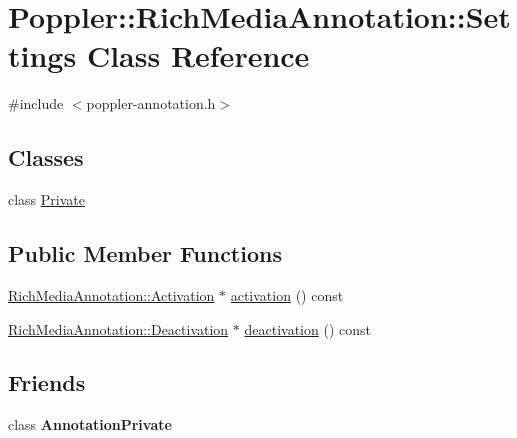 \hypertarget{class_poppler_1_1_rich_media_annotation_1_1_settings}{}\section{Poppler\+:\+:Rich\+Media\+Annotation\+:\+:Settings Class Reference}
\label{class_poppler_1_1_rich_media_annotation_1_1_settings}


{\ttfamily \#include $<$poppler-\/annotation.\+h$>$}

\subsection*{Classes}
\begin{DoxyCompactItemize}
\item 
class \hyperlink{class_poppler_1_1_rich_media_annotation_1_1_settings_1_1_private}{Private}
\end{DoxyCompactItemize}
\subsection*{Public Member Functions}
\begin{DoxyCompactItemize}
\item 
\hyperlink{class_poppler_1_1_rich_media_annotation_1_1_activation}{Rich\+Media\+Annotation\+::\+Activation} $\ast$ \hyperlink{class_poppler_1_1_rich_media_annotation_1_1_settings_a728542a659141af0cf7a721561b20bf4}{activation} () const
\item 
\hyperlink{class_poppler_1_1_rich_media_annotation_1_1_deactivation}{Rich\+Media\+Annotation\+::\+Deactivation} $\ast$ \hyperlink{class_poppler_1_1_rich_media_annotation_1_1_settings_ad82cea32021c702293df20ec644caf16}{deactivation} () const
\end{DoxyCompactItemize}
\subsection*{Friends}
\begin{DoxyCompactItemize}
\item 
\mbox{\label{class_poppler_1_1_rich_media_annotation_1_1_settings_add0bc3e32e560f9e9eb3025587c1ad54}} 
class {\bfseries Annotation\+Private}
\end{DoxyCompactItemize}


